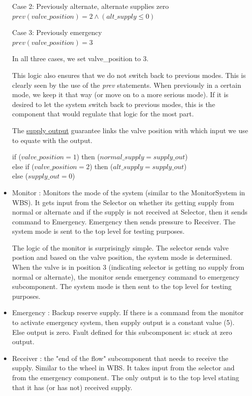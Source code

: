 \documentclass{article}
\begin{document}
\begin{itemize}
Case 2: Previously alternate, alternate supplies zero \\
$prev(valve\_position) = 2 \land (alt\_supply \leq 0)$

Case 3: Previously emergency \\
$prev(valve\_position) = 3$

In all three cases, we set valve\_position to 3. 

This logic also ensures that we do not switch back to previous modes. This is clearly seen by the use of the \textit{prev} statements. When previously in a certain mode, we keep it that way (or move on to a more serious mode). If it is desired to let the system switch back to previous modes, this is the component that would regulate that logic for the most part.

The \underline{supply output} guarantee links the valve position with which input we use to equate with the output. 

if ($valve\_position = 1$) then ($normal\_supply = supply\_out$)\\
else if ($valve\_position = 2$) then ($alt\_supply = supply\_out$)\\
else ($supply\_out = 0$)\\

\item Monitor : Monitors the mode of the system (similar to the MonitorSystem in WBS). It gets input from the Selector on whether its getting supply from normal or alternate and if the supply is not received at Selector, then it sends command to Emergency. Emergency then sends pressure to Receiver. The system mode is sent to the top level for testing purposes.

The logic of the monitor is surprisingly simple. The selector sends valve postion and based on the valve position, the system mode is determined. When the valve is in position 3 (indicating selector is getting no supply from  normal or alternate), the monitor sends emergency command to emergency subcomponent. The system mode is then sent to the top level for testing purposes. 

\item Emergency : Backup reserve supply. If there is a command from the monitor to activate emergency system, then supply output is a constant value (5). Else output is zero. Fault defined for this subcomponent is: stuck at zero output. 

\item Receiver : the "end of the flow" subcomponent that needs to receive the supply. Similar to the wheel in WBS. It takes input from the selector and from the emergency component. The only output is to the top level stating that it has (or has not) received supply. 

\end{itemize}
\end{document}
